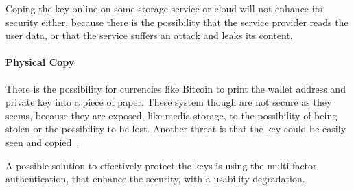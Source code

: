 Coping the key online on some storage service or cloud will not enhance its
security either, because there is the possibility that the service provider
reads the user data, or that the service suffers an attack and leaks its
content.

\paragraph{Physical Copy} There is the possibility for currencies like Bitcoin
to print the wallet address and private key into a piece of paper. These system
though are not secure as they seems, because they are exposed, like media
storage, to the possibility of being stolen or the possibility to be lost.
Another threat is that the key could be easily seen and
copied~\cite{eskandari15}.


A possible solution to effectively protect the keys is using the multi-factor
authentication, that enhance the security, with a usability degradation.
